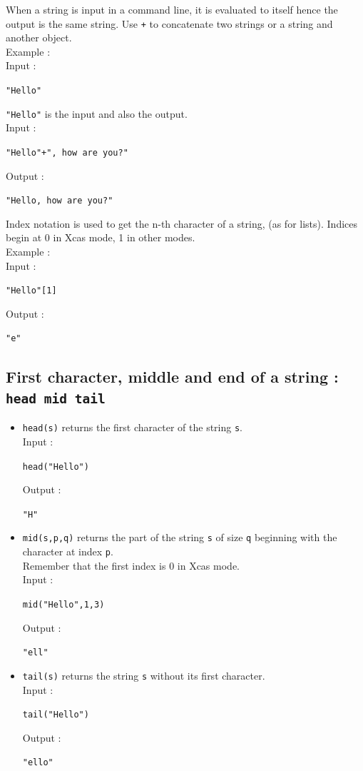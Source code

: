 \documentclass[a4paper,11pt]{book}
\begin{document}
When a string is input in a command line, it is evaluated to itself
hence the output is the same string. Use {\tt +}
to concatenate two strings or a string and another object.\\
Example :\\
Input :
\begin{center}{\tt "Hello"}\end{center}
{\tt "Hello"} is the input and also the output.\\
Input :
\begin{center}{\tt "Hello"+", how are you?"}\end{center}
Output :
\begin{center}{\tt "Hello, how are you?"}\end{center}
Index notation is used to get the n-th character of a string, 
(as for lists). Indices begin at 0 in Xcas mode, 1 in other modes.\\
Example :\\
Input :
\begin{center}{\tt "Hello"[1]}\end{center}
Output :
\begin{center}{\tt "e"}\end{center}

\subsection{First character, middle and end of a string : {\tt head mid tail}} 
\begin{itemize}
\item  {\tt head(s)} returns the first character of the string {\tt s}.\\ 
 Input :
\begin{center}{\tt head("Hello")}\end{center}
Output :
\begin{center}{\tt "H"}\end{center}
\item {\tt mid(s,p,q)} returns the part of the string
{\tt s} of size {\tt q} beginning with the character at index {\tt p}.\\
Remember that the first index is 0 in Xcas mode.\\
Input :
\begin{center}{\tt mid("Hello",1,3)}\end{center}
Output :
\begin{center}{\tt "ell"}\end{center}
\item {\tt tail(s)} returns the string  {\tt s} without its first character.\\ 
Input :
\begin{center}{\tt tail("Hello")}\end{center}
Output :
\begin{center}{\tt "ello"}\end{center}
\end{itemize}
\end{document}
